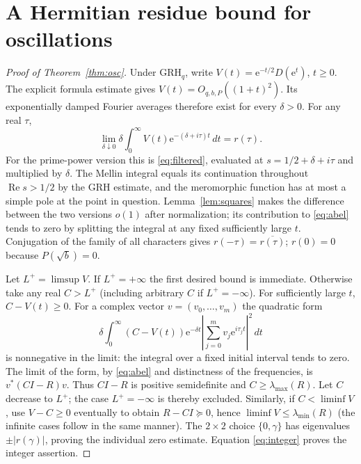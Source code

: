 \documentclass[11pt]{article}
\theoremstyle{definition}\newtheorem{definition}[theorem]{Definition}
\newcommand{\Rea}{\operatorname{Re}}
\newcommand{\GRH}{\mathrm{GRH}}
\newcommand{\ee}{\mathrm{e}}
\begin{document}
\section{A Hermitian residue bound for oscillations}
\begin{proof}[Proof of Theorem~\ref{thm:osc}]
Under $\GRH_q$, write $V(t)=\ee^{-t/2}D(\ee^t)$, $t\ge0$. The explicit formula estimate gives $V(t)=O_{q,b,P}((1+t)^2)$. Its exponentially damped Fourier averages therefore exist for every $\delta>0$. For any real $\tau$,
\begin{equation}\label{eq:abel}
 \lim_{\delta\downarrow0}\delta\int_0^\infty V(t)\ee^{-(\delta+i\tau)t}\,dt=r(\tau).
\end{equation}
For the prime-power version this is \eqref{eq:filtered}, evaluated at $s=1/2+\delta+i\tau$ and multiplied by $\delta$. The Mellin integral equals its continuation throughout $\Rea s>1/2$ by the GRH estimate, and the meromorphic function has at most a simple pole at the point in question. Lemma~\ref{lem:squares} makes the difference between the two versions $o(1)$ after normalization; its contribution to \eqref{eq:abel} tends to zero by splitting the integral at any fixed sufficiently large $t$. Conjugation of the family of all characters gives $r(-\tau)=\overline{r(\tau)}$; $r(0)=0$ because $P(\sqrt b)=0$.

Let $L^+=\limsup V$. If $L^+=+\infty$ the first desired bound is immediate. Otherwise take any real $C>L^+$ (including arbitrary $C$ if $L^+=-\infty$). For sufficiently large $t$, $C-V(t)\ge0$. For a complex vector $v=(v_0,\ldots,v_m)$ the quadratic form
\[
 \delta\int_0^\infty (C-V(t))\ee^{-\delta t}
 \left|\sum_{j=0}^m v_j\ee^{i\tau_jt}\right|^2\,dt
\]
is nonnegative in the limit: the integral over a fixed initial interval tends to zero. The limit of the form, by \eqref{eq:abel} and distinctness of the frequencies, is $v^*(CI-R)v$. Thus $CI-R$ is positive semidefinite and $C\ge\lambda_{\max}(R)$. Let $C$ decrease to $L^+$; the case $L^+=-\infty$ is thereby excluded. Similarly, if $C<\liminf V$, use $V-C\ge0$ eventually to obtain $R-CI\succeq0$, hence $\liminf V\le\lambda_{\min}(R)$ (the infinite cases follow in the same manner). The $2\times2$ choice $\{0,\gamma\}$ has eigenvalues $\pm|r(\gamma)|$, proving the individual zero estimate. Equation \eqref{eq:integer} proves the integer assertion.
\end{proof}
\end{document}
